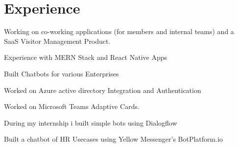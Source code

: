 \documentclass[]{deedy-resume-openfont}
\begin{document}
\begin{minipage}[t]{0.66\textwidth} 


\section{Experience}

\vspace{\topsep} %
\begin{tightemize}
\item Working on co-working applications (for members and internal teams) and a SaaS Visitor Management Product.
\item Experience with MERN Stack and React Native Apps
\end{tightemize}
\sectionsep

\descript{  }
\begin{tightemize}
\item Built Chatbots for various Enterprises
\item Worked on Azure active directory Integration and Authentication
\item Worked on Microsoft Teams Adaptive Cards.
\end{tightemize}

\begin{tightemize}
\item During my internship i built simple bots using Dialogflow
\item Built a chatbot of HR Usecases using Yellow Messenger's BotPlatform.io
\end{tightemize}
\sectionsep



\end{minipage}
\end{document}
